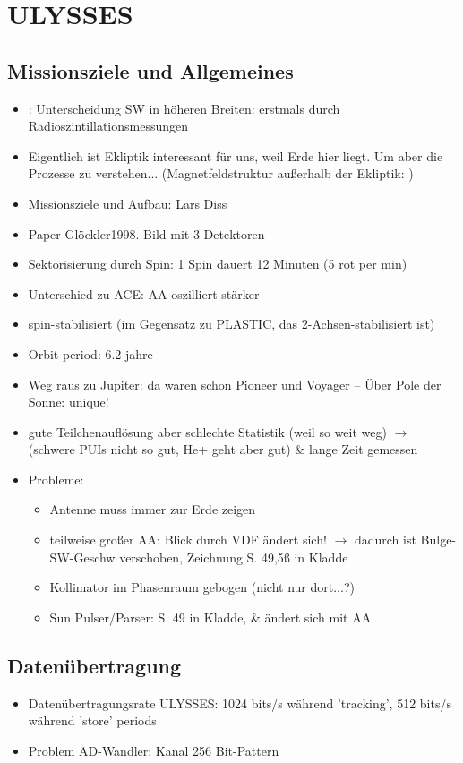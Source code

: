 \documentclass[]{article}
\begin{document}
\section{ULYSSES}
	\subsection{Missionsziele und Allgemeines}
	\begin{itemize}
		\item  \cite[6.1.7]{Prlss2004}: Unterscheidung SW in höheren Breiten: erstmals durch Radioszintillationsmessungen
		\item Eigentlich ist Ekliptik interessant für uns, weil Erde hier liegt. Um aber die Prozesse zu verstehen... (Magnetfeldstruktur außerhalb der Ekliptik: \cite[ch. 6.2.3]{prlss_2004})
		\item Missionsziele und Aufbau: Lars Diss
		\item Paper Glöckler1998. Bild mit 3 Detektoren
		\item Sektorisierung durch Spin: 1 Spin dauert 12 Minuten (5 rot per min)
		\item Unterschied zu ACE: AA oszilliert stärker
		\item spin-stabilisiert (im Gegensatz zu PLASTIC, das 2-Achsen-stabilisiert ist)
		\item Orbit period: 6.2 jahre
		\item Weg raus zu Jupiter: da waren schon Pioneer und Voyager -- Über Pole der Sonne: unique!
		\item gute Teilchenauflösung aber schlechte Statistik (weil so weit weg) $\rightarrow$ (schwere PUIs nicht so gut, He+ geht aber gut) \& lange Zeit gemessen
		\item Probleme:
		\begin{itemize}
			\item Antenne muss immer zur Erde zeigen
			\item teilweise großer AA: Blick durch VDF ändert sich! $\rightarrow$ dadurch ist Bulge-SW-Geschw verschoben, Zeichnung S. 49,5ß in Kladde
			\item Kollimator im Phasenraum gebogen (nicht nur dort...?)
			\item Sun Pulser/Parser: S. 49 in Kladde, \& ändert sich mit AA
		\end{itemize}
	\end{itemize}
	\subsection{Datenübertragung}
		\begin{itemize}
			\item Datenübertragungsrate ULYSSES: 1024 bits/s während 'tracking', 512 bits/s während 'store' periods
			\item Problem AD-Wandler: Kanal 256 Bit-Pattern 
		\end{itemize}
\end{document}
